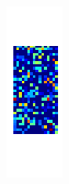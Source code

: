 \begin{frame}[plain]
\begin{figure}
\begin{subfigure}{0.2\textwidth}
\end{subfigure}
\begin{subfigure}{0.2\textwidth}
\includegraphics[width=\textwidth]{mlp_2_hidden}

\end{subfigure}
\end{figure}
\end{frame}
